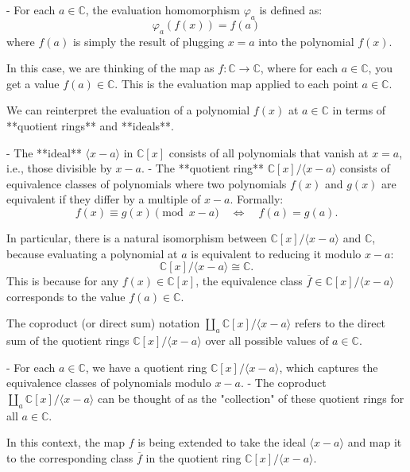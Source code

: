 \documentclass[11pt,openany]{article}
\begin{document}
- For each \( a \in \mathbb{C} \), the evaluation homomorphism \( \varphi_a \) is defined as:
\[
\varphi_a(f(x)) = f(a)
\]
where \( f(a) \) is simply the result of plugging \( x = a \) into the polynomial \( f(x) \).

In this case, we are thinking of the map as \( f: \mathbb{C} \to \mathbb{C} \), where for each \( a \in \mathbb{C} \), you get a value \( f(a) \in \mathbb{C} \). This is the evaluation map applied to each point \( a \in \mathbb{C} \).

We can reinterpret the evaluation of a polynomial \( f(x) \) at \( a \in \mathbb{C} \) in terms of **quotient rings** and **ideals**.

- The **ideal** \( \langle x - a \rangle \) in \( \mathbb{C}[x] \) consists of all polynomials that vanish at \( x = a \), i.e., those divisible by \( x - a \).
- The **quotient ring** \( \mathbb{C}[x] / \langle x - a \rangle \) consists of equivalence classes of polynomials where two polynomials \( f(x) \) and \( g(x) \) are equivalent if they differ by a multiple of \( x - a \). Formally:
\[
f(x) \equiv g(x) \pmod{x - a} \quad \iff \quad f(a) = g(a).
\]

In particular, there is a natural isomorphism between \( \mathbb{C}[x] / \langle x - a \rangle \) and \( \mathbb{C} \), because evaluating a polynomial at \( a \) is equivalent to reducing it modulo \( x - a \):
\[
\mathbb{C}[x] / \langle x - a \rangle \cong \mathbb{C}.
\]
This is because for any \( f(x) \in \mathbb{C}[x] \), the equivalence class \( \overline{f} \in \mathbb{C}[x] / \langle x - a \rangle \) corresponds to the value \( f(a) \in \mathbb{C} \).

The coproduct (or direct sum) notation \( \coprod_a \mathbb{C}[x] / \langle x - a \rangle \) refers to the direct sum of the quotient rings \( \mathbb{C}[x] / \langle x - a \rangle \) over all possible values of \( a \in \mathbb{C} \).

- For each \( a \in \mathbb{C} \), we have a quotient ring \( \mathbb{C}[x] / \langle x - a \rangle \), which captures the equivalence classes of polynomials modulo \( x - a \).
- The coproduct \( \coprod_a \mathbb{C}[x] / \langle x - a \rangle \) can be thought of as the "collection" of these quotient rings for all \( a \in \mathbb{C} \).

In this context, the map \( f \) is being extended to take the ideal \( \langle x - a \rangle \) and map it to the corresponding class \( \overline{f} \) in the quotient ring \( \mathbb{C}[x] / \langle x - a \rangle \).
\end{document}
